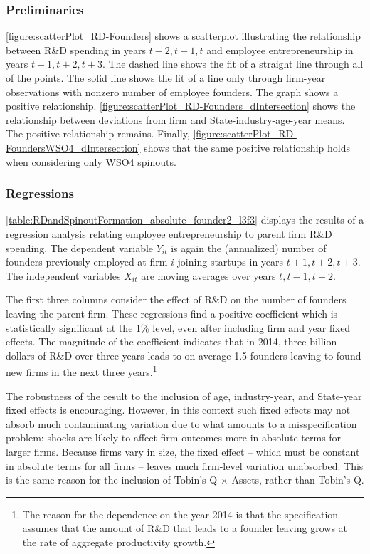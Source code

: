 \documentclass[11pt,english]{article}
\begin{document}
\subsubsection{Preliminaries}

\autoref{figure:scatterPlot_RD-Founders} shows a scatterplot illustrating the relationship between R\&D spending in years $t-2,t-1,t$ and employee entrepreneurship in years $t+1,t+2,t+3$. The dashed line shows the fit of a straight line through all of the points. The solid line shows the fit of a line only through firm-year observations with nonzero number of employee founders. The graph shows a positive relationship. \autoref{figure:scatterPlot_RD-Founders_dIntersection} shows the relationship between deviations from firm and State-industry-age-year means. The positive relationship remains. Finally, \autoref{figure:scatterPlot_RD-FoundersWSO4_dIntersection} shows that the same positive relationship holds when considering only WSO4 spinouts. 


\subsubsection{Regressions}

\autoref{table:RDandSpinoutFormation_absolute_founder2_l3f3} displays the results of a regression analysis relating employee entrepreneurship to parent firm R\&D spending. The dependent variable $Y_{it}$ is again the (annualized) number of founders previously employed at firm $i$ joining startups in years $t+1,t+2,t+3$. The independent variables $X_{it}$ are moving averages over years $t,t-1,t-2$. 

The first three columns consider the effect of R\&D on the number of founders leaving the parent firm. These regressions find a positive coefficient which is statistically significant at the 1\% level, even after including firm and year fixed effects. The magnitude of the coefficient indicates that in 2014, three billion dollars of R\&D over three years leads to on average 1.5 founders leaving to found new firms in the next three years.\footnote{The reason for the dependence on the year 2014 is that the specification assumes that the amount of R\&D that leads to a founder leaving grows at the rate of aggregate productivity growth.} 

The robustness of the result to the inclusion of age, industry-year, and State-year fixed effects is encouraging. However, in this context such fixed effects may not absorb much contaminating variation due to what amounts to a misspecification problem: shocks are likely to affect firm outcomes more in absolute terms for larger firms. Because firms vary in size, the fixed effect -- which must be constant in absolute terms for all firms -- leaves much firm-level variation unabsorbed. This is the same reason for the inclusion of Tobin's Q $\times$ Assets, rather than Tobin's Q. 
\end{document}

